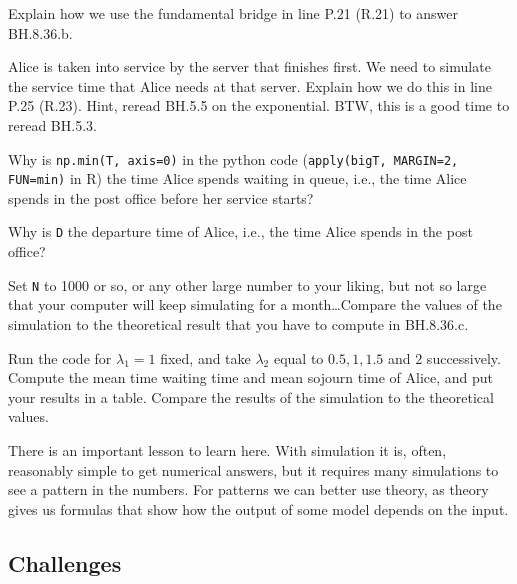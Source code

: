 \documentclass[assignments]{subfiles}
\begin{document}
\begin{exercise}
Explain how we use the fundamental bridge in line P.21 (R.21) to answer BH.8.36.b.
\end{exercise}


\begin{exercise}
Alice is taken into service by the server that finishes first.
We need to simulate the service time that Alice needs at that server.
Explain how we do this in line P.25 (R.23). Hint, reread BH.5.5 on the exponential. BTW, this is a good time to reread BH.5.3.
\end{exercise}

\begin{exercise}
Why is \texttt{np.min(T, axis=0)} in the python code (\texttt{apply(bigT, MARGIN=2, FUN=min)} in  R) the time Alice spends waiting in queue, i.e., the time Alice spends in the post office before her service starts?
\end{exercise}


\begin{exercise}
Why is \texttt{D} the departure time of Alice, i.e., the time Alice spends in the post office?
\end{exercise}


\begin{exercise}
Set \texttt{N} to 1000 or so, or any other large number to your liking, but not so large that your computer will keep simulating for a month\ldots Compare the values of the simulation to the theoretical result that you have to compute in BH.8.36.c.
\end{exercise}


\begin{exercise}
Run the code for $\lambda_{1}=1$ fixed, and take $\lambda_{2}$ equal to $0.5, 1, 1.5$ and $2$ successively. Compute the mean time waiting time and mean sojourn time of Alice, and put your results in a table. Compare the results of the simulation to the theoretical values.
\end{exercise}

There is an important lesson to learn here.
With simulation it is, often, reasonably simple to get numerical answers, but it requires many simulations to see a pattern in the numbers.
For patterns we can better use theory, as theory gives us formulas that show how the output of some model depends on the input.


\subsection{Challenges}
\label{subsec:challenges}
\end{document}
